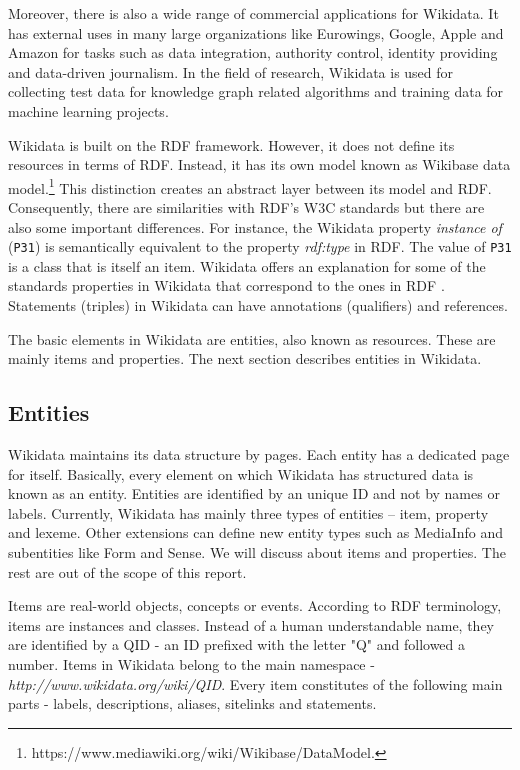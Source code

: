 Moreover, there is also a wide range of commercial applications for Wikidata. It has external uses in many large organizations like Eurowings, Google, Apple and Amazon for tasks such as data integration, authority control, identity providing and data-driven journalism. In the field of research, Wikidata is used for collecting test data for knowledge graph related algorithms and training data for machine learning projects.

Wikidata is built on the RDF framework. However, it does not define its resources in terms of RDF. Instead, it has its own model known as Wikibase data model.\footnote{https://www.mediawiki.org/wiki/Wikibase/DataModel.} This distinction creates an abstract layer between its model and RDF. Consequently, there are similarities with RDF’s W3C standards but there are also some important differences. For instance, the Wikidata property \textit{instance of} (\texttt{P31}) is semantically equivalent to the property \textit{rdf:type} in RDF. The value of \texttt{P31} is a class that is itself an item. Wikidata offers an explanation for some of the standards properties in Wikidata that correspond to the ones in RDF \cite{Foundation}. Statements (triples) in Wikidata can have annotations (qualifiers) and references.

The basic elements in Wikidata are entities, also known as resources. These are mainly items and properties. The next section describes entities in Wikidata. 

\subsection{Entities}
Wikidata maintains its data structure by pages. Each entity has a dedicated page for itself. Basically, every element on which Wikidata has structured data is known as an entity\cite{Erxleben2014}. Entities are identified by an unique ID and not by names or labels. Currently, Wikidata has mainly three types of entities – item, property and lexeme. Other extensions can define new entity types such as MediaInfo and subentities like Form and Sense. We will discuss about items and properties. The rest are out of the scope of this report.

Items are real-world objects, concepts or events. According to RDF terminology, items are instances and classes. Instead of a human understandable name, they are identified by a QID - an ID prefixed with the letter "Q" and followed a number. Items in Wikidata belong to the main namespace - \textit{http://www.wikidata.org/wiki/QID}. Every item constitutes of the following main parts - labels, descriptions, aliases, sitelinks and statements\cite{Erxleben2014}.

